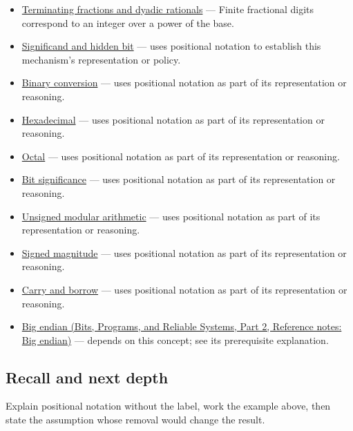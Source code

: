 \begin{itemize}
\item
  \hyperref[appendix-2a2f1b74bdd3]{Terminating fractions and dyadic rationals} --- Finite fractional digits correspond to an integer over a power of the base.
\item
  \hyperref[appendix-a24fd710cf67]{Significand and hidden bit} --- uses positional notation to establish this mechanism's representation or policy.
\item
  \hyperref[appendix-dc552784a2c0]{Binary conversion} --- uses positional notation as part of its representation or reasoning.
\item
  \hyperref[appendix-6b8075763724]{Hexadecimal} --- uses positional notation as part of its representation or reasoning.
\item
  \hyperref[appendix-17fc1bc8b305]{Octal} --- uses positional notation as part of its representation or reasoning.
\item
  \hyperref[appendix-280445746493]{Bit significance} --- uses positional notation as part of its representation or reasoning.
\item
  \hyperref[appendix-c99977d88b33]{Unsigned modular arithmetic} --- uses positional notation as part of its representation or reasoning.
\item
  \hyperref[appendix-ce20506c8532]{Signed magnitude} --- uses positional notation as part of its representation or reasoning.
\item
  \hyperref[appendix-d52d5f78ffd1]{Carry and borrow} --- uses positional notation as part of its representation or reasoning.
\item
  \href{../01-Bits-Programs-and-Reliable-Systems-P02/main.pdf\#nameddest=appendix-92e040df969a}{Big endian (Bits, Programs, and Reliable Systems, Part 2, Reference notes: Big endian)} --- depends on this concept; see its prerequisite explanation.
\end{itemize}

\subsection{Recall and next depth}\label{appendix-83c3f28f7bda-recall-and-next-depth}

\hypertarget{appendix-83c3f28f7bda-recall-and-next-depth}{}

Explain positional notation without the label, work the example above, then state the assumption whose removal would change the result.

